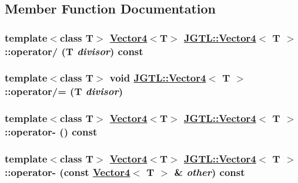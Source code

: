 \subsection{Member Function Documentation}
\hypertarget{class_j_g_t_l_1_1_vector4_020cb9f5ed100b9b10e2b1d81c7ca353}{
\subsubsection[operator/]{\setlength{\rightskip}{0pt plus 5cm}template$<$class T$>$ \hyperlink{class_j_g_t_l_1_1_vector4}{Vector4}$<$T$>$ \hyperlink{class_j_g_t_l_1_1_vector4}{JGTL::Vector4}$<$ T $>$::operator/ (T {\em divisor}) const}}
\label{class_j_g_t_l_1_1_vector4_020cb9f5ed100b9b10e2b1d81c7ca353}


\hypertarget{class_j_g_t_l_1_1_vector4_cf745186ea3585257445f04d665c0bd1}{
\subsubsection[operator/=]{\setlength{\rightskip}{0pt plus 5cm}template$<$class T$>$ void \hyperlink{class_j_g_t_l_1_1_vector4}{JGTL::Vector4}$<$ T $>$::operator/= (T {\em divisor})}}
\label{class_j_g_t_l_1_1_vector4_cf745186ea3585257445f04d665c0bd1}


\hypertarget{class_j_g_t_l_1_1_vector4_c8ee2ad1d7134da444fbc25a9ef95571}{
\subsubsection[operator-]{\setlength{\rightskip}{0pt plus 5cm}template$<$class T$>$ \hyperlink{class_j_g_t_l_1_1_vector4}{Vector4}$<$T$>$ \hyperlink{class_j_g_t_l_1_1_vector4}{JGTL::Vector4}$<$ T $>$::operator- () const}}
\label{class_j_g_t_l_1_1_vector4_c8ee2ad1d7134da444fbc25a9ef95571}


\hypertarget{class_j_g_t_l_1_1_vector4_d79eb06d34969cd4d6f040369e288918}{
\subsubsection[operator-]{\setlength{\rightskip}{0pt plus 5cm}template$<$class T$>$ \hyperlink{class_j_g_t_l_1_1_vector4}{Vector4}$<$T$>$ \hyperlink{class_j_g_t_l_1_1_vector4}{JGTL::Vector4}$<$ T $>$::operator- (const \hyperlink{class_j_g_t_l_1_1_vector4}{Vector4}$<$ T $>$ \& {\em other}) const}}
\label{class_j_g_t_l_1_1_vector4_d79eb06d34969cd4d6f040369e288918}


